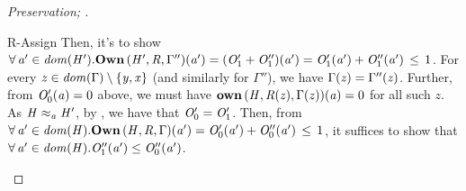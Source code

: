 \begin{proof}[Preservation; ]
\begin{rneqncase}{R-Assign}
    Then, it's to show $\forall \,  \mathit{a'}  \in \mathit{dom}( \mathit{H'} )   .  \mathbf{Own} \, (  \mathit{H'}  ,  \mathit{R}  ,  \Gamma''  )  (  \mathit{a'}  )  =  (  \mathit{O'_{{\mathrm{1}}}}  +  \mathit{O''_{{\mathrm{1}}}}  )  (  \mathit{a'}  )  =  \mathit{O'_{{\mathrm{1}}}}  (  \mathit{a'}  )  +  \mathit{O''_{{\mathrm{1}}}}  (  \mathit{a'}  ) \, \le \, 1$.
    For every $ \mathit{z}  \in    \mathit{dom}( \Gamma )   \setminus  \{  \mathit{y}  ,  \mathit{x}  \}  $ (and similarly for $\Gamma''$), we have
    $\Gamma  (  \mathit{z}  )  =  \Gamma''  (  \mathit{z}  )$. Further, from $\mathit{O'_{{\mathrm{0}}}}  (  \mathit{a}  )  =  0$ above, we must have $\mathbf{own} \, (  \mathit{H}  ,  \mathit{R}  (  \mathit{z}  )  ,  \Gamma  (  \mathit{z}  )  )  (  \mathit{a}  )  =  0$
    for all such $\mathit{z}$. As $ \mathit{H}   \approx _ {\mathit{a}}   \mathit{H'} $, by , we have that $\mathit{O'_{{\mathrm{0}}}}  =  \mathit{O'_{{\mathrm{1}}}}$.
    Then, from $\forall \,  \mathit{a'}  \in \mathit{dom}( \mathit{H} )   .  \mathbf{Own} \, (  \mathit{H}  ,  \mathit{R}  ,  \Gamma  )  (  \mathit{a'}  )  =  \mathit{O'_{{\mathrm{0}}}}  (  \mathit{a'}  )  +  \mathit{O''_{{\mathrm{0}}}}  (  \mathit{a'}  ) \, \le \, 1$, it suffices to show
    that $\forall \,  \mathit{a'}  \in \mathit{dom}( \mathit{H} )   .  \mathit{O''_{{\mathrm{1}}}}  (  \mathit{a'}  )  \le  \mathit{O''_{{\mathrm{0}}}}  (  \mathit{a'}  )$.
       

\end{rneqncase}
\end{proof}
